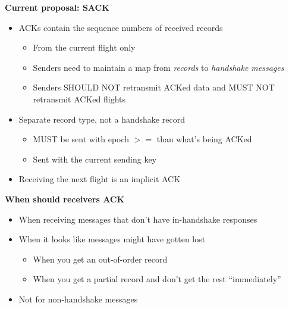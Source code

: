 \documentclass[helvetica]{seminar}
\newcommand{\heading}[1]{%
  \begin{center} 
    \large\bf 
    #1 
  \end{center} 
  \vspace{.4 in}}
\begin{document}
\begin{slide}
  \heading{Current proposal: SACK}

  \begin{itemize}
  \item ACKs contain the sequence numbers of received records
    \begin{itemize}
    \item From the current flight only
    \item Senders need to maintain a map from \emph{records} to \emph{handshake messages}
    \item Senders SHOULD NOT retransmit ACKed data and MUST NOT retransmit ACKed flights
    \end{itemize}
  \item Separate record type, not a handshake record
    \begin{itemize}
    \item MUST be sent with epoch $>=$ than what's being ACKed
    \item Sent with the current sending key
    \end{itemize}
  \item Receiving the next flight is an implicit ACK
  \end{itemize}
\end{slide}


\begin{slide}
  \heading{When should receivers ACK}

  \begin{itemize}
  \item When receiving messages that don't have in-handshake responses
  \item When it looks like messages might have gotten lost
    \begin{itemize}
    \item When you get an out-of-order record
    \item When you get a partial record and don't get the rest ``immediately''
    \end{itemize}
  \item Not for non-handshake messages
  \end{itemize}

\end{slide}
\end{document}
